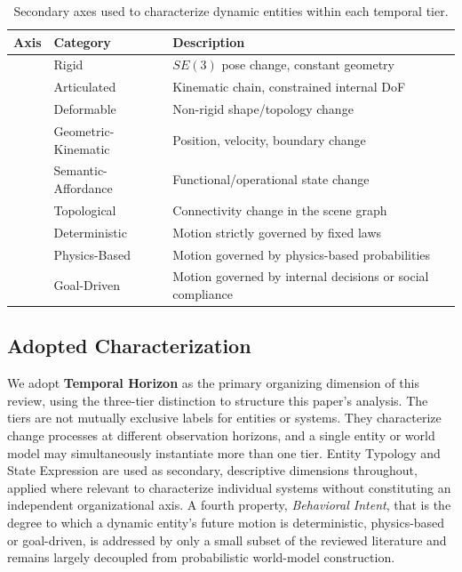 \begin{table}[t]
\centering
\scriptsize
\setlength{\tabcolsep}{3pt}
\renewcommand{\arraystretch}{1.15}
\caption{Secondary axes used to characterize dynamic entities within each
temporal tier.}\label{tab:dynamics_taxonomy}
    \begin{tabularx}{\columnwidth}{@{}l l X@{}}
    \toprule
    \textbf{Axis} & \textbf{Category} & \textbf{Description} \\
    \midrule
     & Rigid       & $SE(3)$ pose change, constant geometry \\
     & Articulated & Kinematic chain, constrained internal DoF \\
     & Deformable  & Non-rigid shape/topology change \\
    \midrule
     & Geometric-Kinematic  & Position, velocity, boundary change \\
     & Semantic-Affordance  & Functional/operational state change \\
     & Topological          & Connectivity change in the scene graph \\
    \midrule
    \midrule
     & Deterministic  & Motion strictly governed by fixed laws \\
     & Physics-Based  & Motion governed by physics-based probabilities \\
     & Goal-Driven    & Motion governed by internal decisions or social compliance \\
    \bottomrule
    \end{tabularx}
\end{table}

\subsection{Adopted Characterization}\label{sec:taxonomy_adopted_characterization}
We adopt \textbf{Temporal Horizon} as the primary organizing dimension of this review, using the three-tier distinction to structure this paper's analysis.
The tiers are not mutually exclusive labels for entities or systems. They characterize change processes at different observation horizons, and a single entity or world model may simultaneously instantiate more than one tier.
Entity Typology and State Expression are used as secondary, descriptive dimensions throughout, applied where relevant to characterize individual systems without constituting an independent organizational axis.
A fourth property, \textit{Behavioral Intent}, that is the degree to which a dynamic entity's future motion is deterministic, physics-based or goal-driven, is addressed by only a small subset of the reviewed literature \cite{catalano_aion_2025} \cite{gorlo_long-term_2024} and remains largely decoupled from probabilistic world-model construction.

